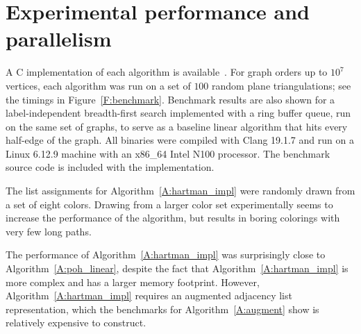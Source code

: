 \documentclass[12pt,letterpaper]{article}
\theoremstyle{plain}
\theoremstyle{definition}
\theoremstyle{break}
\begin{document}
\section{Experimental performance and parallelism}

A C implementation of each algorithm is available~\cite{Bro2017}.
For graph orders up to $10^7$ vertices, each algorithm
was run on a set of $100$ random plane triangulations; see the timings in
Figure~\ref{F:benchmark}.
Benchmark results are also shown
for a label-independent breadth-first search implemented with
a ring buffer queue, run on the same set of graphs, to serve
as a baseline linear
algorithm that hits every half-edge of the graph.
All binaries 
were compiled with Clang 19.1.7 and run on a Linux 6.12.9 machine
with an x86\_64 Intel N100 processor.
The benchmark
source code is included with the implementation.

The list assignments for Algorithm~\ref{A:hartman_impl} were randomly
drawn from a set of eight colors. Drawing from a larger color set
experimentally seems to
increase the performance of the algorithm, but results in boring colorings
with very few long paths.

The performance of
Algorithm~\ref{A:hartman_impl} was surprisingly close to
Algorithm~\ref{A:poh_linear}, despite the fact that
Algorithm~\ref{A:hartman_impl} is more complex and has a larger memory
footprint.
However, Algorithm~\ref{A:hartman_impl} requires an augmented adjacency list
representation, which the benchmarks for Algorithm~\ref{A:augment} show
is relatively expensive to construct.
\end{document}
